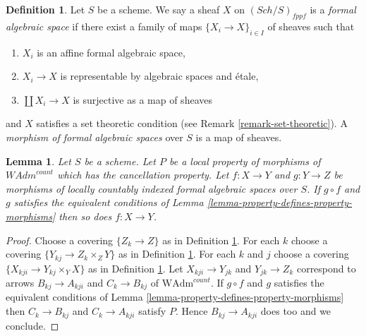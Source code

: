 \documentclass{stacks-project}
\theoremstyle{plain}
\newtheorem{lemma}[subsection]{Lemma}
\theoremstyle{definition}
\newtheorem{definition}[subsection]{Definition}
\theoremstyle{remark}
\numberwithin{equation}{subsection}
\def\Sch{\mathit{Sch}}
\begin{document}
\begin{definition}
\label{definition-formal-algebraic-space}
Let $S$ be a scheme. We say a sheaf $X$ on $(\Sch/S)_{fppf}$ is a
{\it formal algebraic space} if there exist a family of maps
$\{X_i \to X\}_{i \in I}$ of sheaves such that
\begin{enumerate}
\item $X_i$ is an affine formal algebraic space,
\item $X_i \to X$ is representable by algebraic spaces and \'etale,
\item $\coprod X_i \to X$ is surjective as a map of sheaves
\end{enumerate}
and $X$ satisfies a set theoretic condition
(see Remark \ref{remark-set-theoretic}). A
{\it morphism of formal algebraic spaces}
over $S$ is a map of sheaves.
\end{definition}

\begin{lemma}
\label{lemma-permanence-property-morphisms}
Let $S$ be a scheme. Let $P$ be a local property of morphisms of
$\textit{WAdm}^{count}$ which has the cancellation property.
Let $f : X \to Y$ and $g : Y \to Z$ be morphisms of locally countably indexed
formal algebraic spaces over $S$. If $g \circ f$ and $g$
satisfies the equivalent conditions of
Lemma \ref{lemma-property-defines-property-morphisms}
then so does $f : X \to Y$.
\end{lemma}

\begin{proof}
Choose a covering $\{Z_k \to Z\}$ as in
Definition \ref{definition-formal-algebraic-space}.
For each $k$ choose a covering $\{Y_{kj} \to Z_k \times_Z Y\}$
as in Definition \ref{definition-formal-algebraic-space}.
For each $k$ and $j$ choose a covering $\{X_{kji} \to Y_{kj} \times_Y X\}$
as in Definition \ref{definition-formal-algebraic-space}.
Let $X_{kji} \to Y_{jk}$ and $Y_{jk} \to Z_k$
correspond to arrows
$B_{kj} \to A_{kji}$ and $C_k \to B_{kj}$ of
$\text{WAdm}^{count}$.
If $g \circ f$ and $g$ satisfies the equivalent conditions of
Lemma \ref{lemma-property-defines-property-morphisms}
then $C_k \to B_{kj}$ and $C_k \to A_{kji}$ satisfy $P$.
Hence $B_{kj} \to A_{kji}$ does too and we conclude.
\end{proof}
\end{document}
